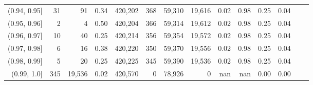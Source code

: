 \begin{tabular}{rrrrrrrrrrrrrr}
(0.94, 0.95]   &      31 &      91 &      0.34 &  420,202 &      368 &  59,310 &  19,616 &  0.02 &  0.98 &  0.25 &      0.04 \\
(0.95, 0.96]   &       2 &       4 &      0.50 &  420,204 &      366 &  59,314 &  19,612 &  0.02 &  0.98 &  0.25 &      0.04 \\
(0.96, 0.97]   &      10 &      40 &      0.25 &  420,214 &      356 &  59,354 &  19,572 &  0.02 &  0.98 &  0.25 &      0.04 \\
(0.97, 0.98]   &       6 &      16 &      0.38 &  420,220 &      350 &  59,370 &  19,556 &  0.02 &  0.98 &  0.25 &      0.04 \\
(0.98, 0.99]   &       5 &      20 &      0.25 &  420,225 &      345 &  59,390 &  19,536 &  0.02 &  0.98 &  0.25 &      0.04 \\
(0.99, 1.0]    &     345 &  19,536 &      0.02 &  420,570 &        0 &  78,926 &       0 &   nan &   nan &  0.00 &      0.00 \\
\bottomrule
\end{tabular}
